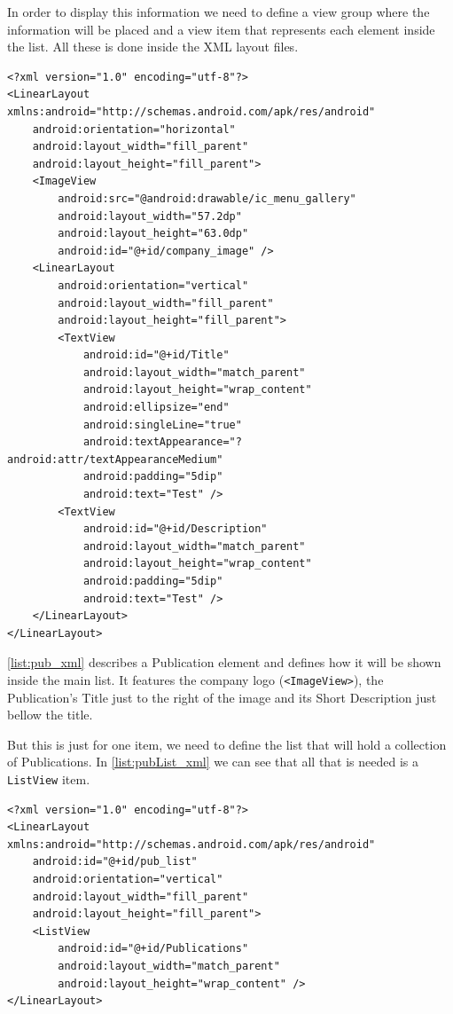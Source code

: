 In order to display this information we need to define a view group where the information will be placed and a view item that represents each element inside the list. All these is done inside the \ac{XML} layout files.

\begin{lstlisting}[frame=lt,caption=Publication.axml, label={list:pub_xml}]
<?xml version="1.0" encoding="utf-8"?>
<LinearLayout xmlns:android="http://schemas.android.com/apk/res/android"
    android:orientation="horizontal"
    android:layout_width="fill_parent"
    android:layout_height="fill_parent">
    <ImageView
        android:src="@android:drawable/ic_menu_gallery"
        android:layout_width="57.2dp"
        android:layout_height="63.0dp"
        android:id="@+id/company_image" />
    <LinearLayout
        android:orientation="vertical"
        android:layout_width="fill_parent"
        android:layout_height="fill_parent">
        <TextView
            android:id="@+id/Title"
            android:layout_width="match_parent"
            android:layout_height="wrap_content"
            android:ellipsize="end"
            android:singleLine="true"
            android:textAppearance="?android:attr/textAppearanceMedium"
            android:padding="5dip"
            android:text="Test" />
        <TextView
            android:id="@+id/Description"
            android:layout_width="match_parent"
            android:layout_height="wrap_content"
            android:padding="5dip"
            android:text="Test" />
    </LinearLayout>
</LinearLayout>
\end{lstlisting}

\autoref{list:pub_xml} describes a Publication element and defines how it will be shown inside the main list. It features the company logo (\texttt{<ImageView>}), the Publication's Title just to the right of the image and its Short Description just bellow the title.

But this is just for one item, we need to define the list that will hold a collection of Publications. In \autoref{list:pubList_xml} we can see that all that is needed is a \texttt{ListView} item. 

\begin{lstlisting}[frame=lt,caption=PublicationsList.axml, label={list:pubList_xml}]
<?xml version="1.0" encoding="utf-8"?>
<LinearLayout xmlns:android="http://schemas.android.com/apk/res/android"
    android:id="@+id/pub_list"
    android:orientation="vertical"
    android:layout_width="fill_parent"
    android:layout_height="fill_parent">
    <ListView
        android:id="@+id/Publications"
        android:layout_width="match_parent"
        android:layout_height="wrap_content" />
</LinearLayout>
\end{lstlisting}


